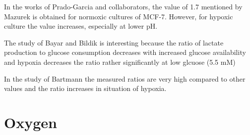 \documentclass[11pt,a4paper]{article}
\begin{document}
In the works of Prado-Garcia and collaborators, the value of 1.7 mentioned by Mazurek is obtained for normoxic cultures of MCF-7. However, for hypoxic culture the value increases, especially at lower pH.

The study of Bayar and Bildik is interesting because the ratio of lactate production to glucose consumption decreases with increased glucose availability and hypoxia decreases the ratio rather significantly at low glcuose (5.5 mM)

In the study of Bartmann the measured ratios are very high compared to other values and the ratio increases in situation of hypoxia. 


\section{Oxygen}
\newpage


\end{document}

